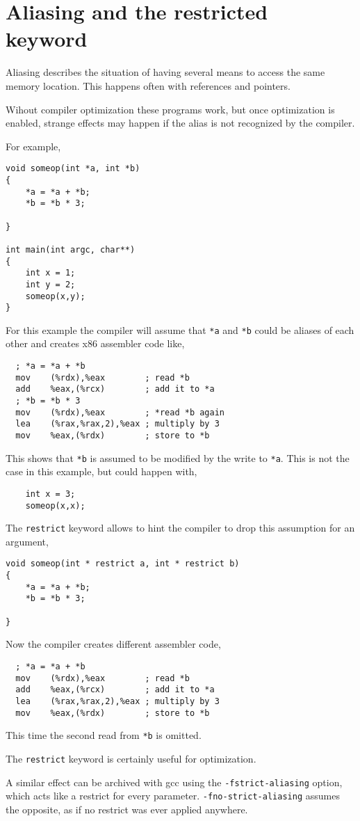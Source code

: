 \documentclass[12pt]{article}
\begin{document}
\section{Aliasing and the restricted keyword}
Aliasing describes the situation of having several means to
access the same memory location.
This happens often with references and pointers.

Wihout compiler optimization these programs work, but once optimization is enabled, strange effects may happen if the
alias is not recognized by the compiler.

For example,
\begin{verbatim}
void someop(int *a, int *b)
{
    *a = *a + *b;
    *b = *b * 3;
    
}

int main(int argc, char**)
{
    int x = 1;
    int y = 2;
    someop(x,y);
}
\end{verbatim}
For this example the compiler will assume that
\texttt{*a} and \texttt{*b} could be aliases of each other
and creates x86 assembler code like,
\begin{verbatim}
  ; *a = *a + *b
  mov    (%rdx),%eax        ; read *b
  add    %eax,(%rcx)        ; add it to *a
  ; *b = *b * 3
  mov    (%rdx),%eax        ; *read *b again
  lea    (%rax,%rax,2),%eax ; multiply by 3
  mov    %eax,(%rdx)        ; store to *b
\end{verbatim}
This shows that \texttt{*b} is assumed to be modified by
the write to \texttt{*a}. This is not the case in this example, but could happen with,
\begin{verbatim}
    int x = 3;
    someop(x,x);
\end{verbatim}

The \texttt{restrict} keyword allows to hint the compiler to drop this assumption for an argument,
\begin{verbatim}
void someop(int * restrict a, int * restrict b)
{
    *a = *a + *b;
    *b = *b * 3;
    
}
\end{verbatim}
Now the compiler creates different assembler code,
\begin{verbatim}
  ; *a = *a + *b
  mov    (%rdx),%eax        ; read *b
  add    %eax,(%rcx)        ; add it to *a
  lea    (%rax,%rax,2),%eax ; multiply by 3
  mov    %eax,(%rdx)        ; store to *b
\end{verbatim}
This time the second read from \texttt{*b} is omitted.

The \texttt{restrict} keyword is certainly useful for
optimization.

A similar effect can be archived with gcc using the
\texttt{-fstrict-aliasing} option, which acts like a
restrict for every parameter.
\texttt{-fno-strict-aliasing} assumes the opposite,
as if no restrict was ever applied anywhere.
\end{document}
